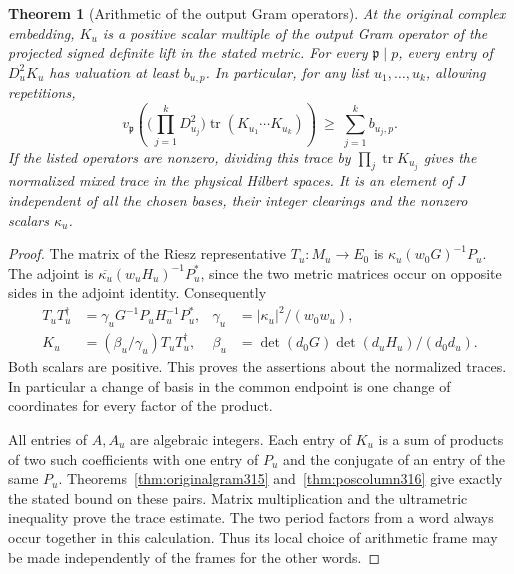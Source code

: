 \documentclass[a4paper,11pt]{article}
\newtheorem{theorem}[proposition]{Theorem}
\theoremstyle{definition}
\theoremstyle{remark}
\numberwithin{equation}{section}
\begin{document}
\begin{theorem}[Arithmetic of the output Gram operators]\leavevmode
\label{thm:closedperiod318}
At the original complex embedding, \(K_u\) is a positive
scalar multiple of the output Gram operator of the projected
signed definite lift in the stated metric. For every
\(\mathfrak p\mid p\), every entry of \(D_u^2 K_u\) has
valuation at least \(b_{u,p}\). In particular, for any list
\(u_1,\ldots,u_k\), allowing repetitions,
\[
 v_{\mathfrak p}\left(
    \Big(\prod_{j=1}^k D_{u_j}^2\Big)
              \operatorname{tr}(K_{u_1}\cdots K_{u_k})\right)
                  \ \ge\ \sum_{j=1}^k b_{u_j,p}.
\]
If the listed operators are nonzero, dividing this trace
by \(\prod_j\operatorname{tr}K_{u_j}\) gives the normalized
mixed trace in the physical Hilbert spaces. It is an element
of \(J\) independent of all the chosen bases, their integer
clearings and the nonzero scalars \(\kappa_u\).
\end{theorem}
\begin{proof}
The matrix of the Riesz representative \(T_u:M_u\to E_0\)
is \(\kappa_u(w_0G)^{-1}P_u\). The adjoint is
\(\overline{\kappa_u}(w_u H_u)^{-1}P_u^*\), since the two
metric matrices occur on opposite sides in the adjoint
identity. Consequently
\[
 \begin{aligned}
 T_uT_u^\dagger&=\gamma_u G^{-1}P_u H_u^{-1}P_u^*,
        &\gamma_u&=|\kappa_u|^2/(w_0w_u),\\
 K_u&=(\beta_u/\gamma_u)T_uT_u^\dagger,
        &\beta_u&=
    \det(d_0G)\det(d_uH_u)/(d_0d_u).
 \end{aligned}
\]
Both scalars are positive. This proves the assertions about
the normalized traces. In particular a change of basis in
the common endpoint is one change of coordinates for every
factor of the product.

All entries of \(A,A_u\) are algebraic integers. Each entry
of \(K_u\) is a sum of products of two such coefficients
with one entry of \(P_u\) and the conjugate of an entry of
the same \(P_u\). Theorems~\ref{thm:originalgram315}
and~\ref{thm:poscolumn316} give exactly the stated bound
on these pairs. Matrix multiplication and the ultrametric
inequality prove the trace estimate. The two period factors
from a word always occur together in this calculation.
Thus its local choice of arithmetic frame may be made
independently of the frames for the other words.
\end{proof}
\end{document}
